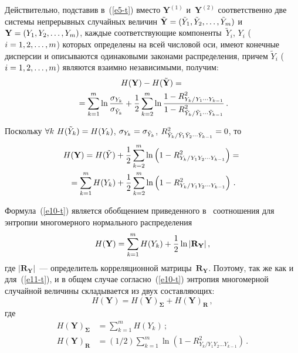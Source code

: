 \begin{multicols}{2}
  Действительно, подставив в~(\ref{e5-t}) вместо $\mathbf{Y}^{(1)}$ 
и~$\mathbf{Y}^{(2)}$ соответственно две системы непрерывных случайных 
величин $\tilde{\mathbf{Y}} \hm= (\tilde{Y}_1,\tilde{Y}_2, \ldots , \tilde{Y}_m)$ 
и $\mathbf{Y}\hm= (Y_1,Y_2,\ldots , Y_m)$, каждые соответствующие 
компоненты~$\tilde{Y}_i$, $Y_i$ ($i\hm=1,2,\ldots ,m$) которых определены на 
всей числовой оси, имеют конечные дисперсии и описываются одинаковыми 
законами распределения, причем $\tilde{Y}_i$ ($i\hm=1,2,\ldots ,m$) являются 
взаимно независимыми, получим:
  \begin{multline*}
  H(\mathbf{Y}) -H(\tilde{\mathbf{Y}})= {}\\
  {}=\sum\limits_{k=1}^m \ln 
\displaystyle\frac{\displaystyle \sigma_{Y_k}\mathstrut}{\displaystyle \sigma_{\tilde{Y}_k}\mathstrut}+\displaystyle\frac{\displaystyle 1\mathstrut}{\displaystyle 2\mathstrut} \sum\limits_{k=2}^m \ln 
  \displaystyle\frac{\displaystyle 1-R^2_{Y_k/Y_1\cdots Y_{k-1}}\mathstrut}{\displaystyle 1-R^2_{\tilde{Y}_k/\tilde{Y}_1\cdots 
\tilde{Y}_{k-1}}\mathstrut}\,.
  \end{multline*}
  
  Поскольку $\forall k\ H(\tilde{Y}_k) \hm= H(Y_k)$, $\sigma_{Y_k}\hm= 
\sigma_{\tilde{Y}_k}$, $R^2_{\tilde{Y}_k/\tilde{Y}_1\tilde{Y}_2\cdots 
\tilde{Y}_{k-1}}\hm=0$, то
\begin{multline*}
  H(\mathbf{Y}) =H(\tilde{Y}) +\displaystyle\frac{\displaystyle 1\mathstrut}{\displaystyle 2\mathstrut}\sum\limits_{k=2}^m \ln \left( 1-
R^2_{Y_k/Y_1Y_2\cdots Y_{k-1}}\right) = {}\\
{}=\sum\limits_{k=1}^m H(Y_k) +\displaystyle\frac{\displaystyle 1\mathstrut}{\displaystyle 2\mathstrut} 
\sum\limits_{k=2}^m \ln \left (1-R^2_{Y_k/Y_1Y_2\cdots Y_{k-1}}\right)\,.
  \end{multline*}
  
  Формула~(\ref{e10-t}) является обобщением приведенного в~\cite{13-t} 
соотношения для энтропии многомерного нормального распределения
  \begin{equation}
  H(\mathbf{Y}) =\sum\limits_{k=1}^m H(Y_k) +\displaystyle\frac{\displaystyle 1\mathstrut}{\displaystyle 2\mathstrut} \ln \vert 
\mathbf{R}_{\mathbf{Y}} \vert\,,
  \label{e11-t}
  \end{equation}
  где $\vert \mathbf{R}_{\mathbf{Y}}\vert$~--- определитель корреляционной 
матрицы~$\mathbf{R}_{\mathbf{Y}}$.
  Поэтому, так же как и для~(\ref{e11-t}), и в общем случае 
  согласно~(\ref{e10-t}) энтропия многомерной случайной величины 
складывается из двух со\-став\-ля\-ющих:
  \begin{equation}
      H(\mathbf{Y}) =H(\mathbf{Y})_{\boldsymbol{\Sigma}} +H(\mathbf{Y})_{\mathbf{R}}\,,
  \label{e12-t}
  \end{equation}
  где 
  \begin{align*}
  H(\mathbf{Y})_{\boldsymbol{\Sigma}} & = \sum\limits_{k=1}^m H(Y_k)\,;
\\
  H(\mathbf{Y})_{\mathbf{R}} &= (1/2)\sum\limits_{k=1}^m  \ln \left( 1-
R^2_{Y_k/Y_1Y_2\ldots Y_{k-1}}\right)\,.
\end{align*}
  

\end{multicols}
